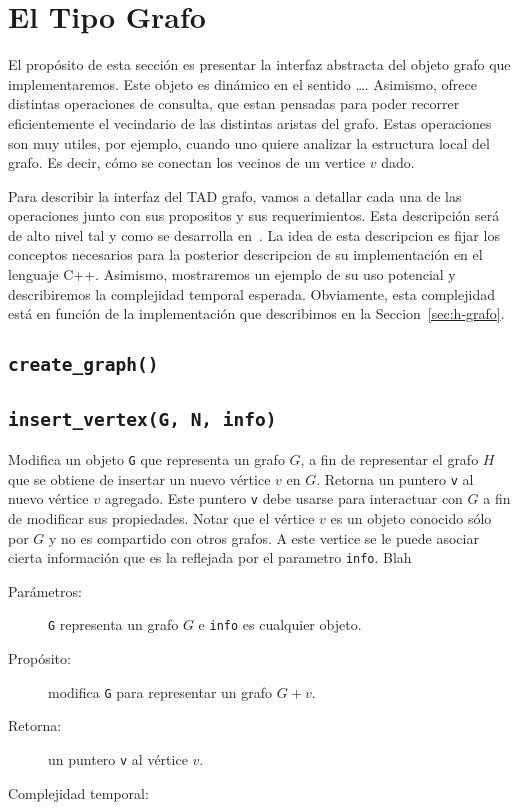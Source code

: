 \documentclass[a4paper,12pt]{article}
\begin{document}
\section{El Tipo Grafo}
\label{sec:tad grafo}

El propósito de esta sección es presentar la interfaz abstracta del objeto grafo que implementaremos.  Este objeto es dinámico en el sentido \ldots.  Asimismo, ofrece distintas operaciones de consulta, que estan pensadas para poder recorrer eficientemente el vecindario de las distintas aristas del grafo.  Estas operaciones son muy utiles, por ejemplo, cuando uno quiere analizar la estructura local del grafo.  Es decir, cómo se conectan los vecinos de un vertice $v$ dado.  

Para describir la interfaz del TAD grafo, vamos a detallar cada una de las operaciones junto con sus propositos y sus requerimientos.  Esta descripción será de alto nivel tal y como se desarrolla en~\cite{}.  La idea de esta descripcion es fijar los conceptos necesarios para la posterior descripcion de su implementación en el lenguaje C++.  Asimismo, mostraremos un ejemplo de su uso potencial y describiremos la complejidad temporal esperada.  Obviamente, esta complejidad está en función de la implementación que describimos en la Seccion~\ref{sec:h-grafo}.  

\subsection{\texttt{create\_graph()}}

\subsection{\texttt{insert\_vertex(G, N, info)}}
\label{sec:tad grafo:insert-vertex}

Modifica un objeto \texttt{G} que representa un grafo $G$, a fin de representar el grafo $H$ que se obtiene de insertar un nuevo vértice $v$ en $G$.  Retorna un puntero \texttt{v} al nuevo vértice $v$ agregado.  Este puntero \texttt{v} debe usarse para interactuar con $G$ a fin de modificar sus propiedades.  Notar que el vértice $v$ es un objeto conocido sólo por $G$ y no es compartido con otros grafos.  A este vertice se le puede asociar cierta información que es la reflejada por el parametro \texttt{info}.  Blah
  
\begin{description}
  \item [Parámetros:] \texttt{G} representa un grafo $G$ e \texttt{info} es cualquier objeto.
  \item [Propósito:] modifica \texttt{G} para representar un grafo $G + v$.
  \item [Retorna:] un puntero \texttt{v} al vértice $v$.
  \item [Complejidad temporal:]
\end{description}
\end{document}
